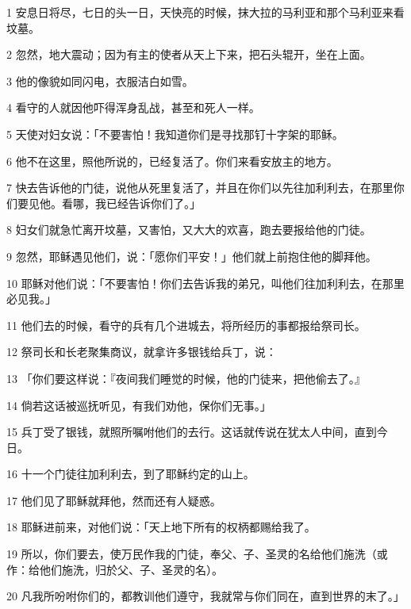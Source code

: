 \par 1 安息日将尽，七日的头一日，天快亮的时候，抹大拉的马利亚和那个马利亚来看坟墓。
\par 2 忽然，地大震动；因为有主的使者从天上下来，把石头辊开，坐在上面。
\par 3 他的像貌如同闪电，衣服洁白如雪。
\par 4 看守的人就因他吓得浑身乱战，甚至和死人一样。
\par 5 天使对妇女说：「不要害怕！我知道你们是寻找那钉十字架的耶稣。
\par 6 他不在这里，照他所说的，已经复活了。你们来看安放主的地方。
\par 7 快去告诉他的门徒，说他从死里复活了，并且在你们以先往加利利去，在那里你们要见他。看哪，我已经告诉你们了。」
\par 8 妇女们就急忙离开坟墓，又害怕，又大大的欢喜，跑去要报给他的门徒。
\par 9 忽然，耶稣遇见他们，说：「愿你们平安！」他们就上前抱住他的脚拜他。
\par 10 耶稣对他们说：「不要害怕！你们去告诉我的弟兄，叫他们往加利利去，在那里必见我。」
\par 11 他们去的时候，看守的兵有几个进城去，将所经历的事都报给祭司长。
\par 12 祭司长和长老聚集商议，就拿许多银钱给兵丁，说：
\par 13 「你们要这样说：『夜间我们睡觉的时候，他的门徒来，把他偷去了。』
\par 14 倘若这话被巡抚听见，有我们劝他，保你们无事。」
\par 15 兵丁受了银钱，就照所嘱咐他们的去行。这话就传说在犹太人中间，直到今日。
\par 16 十一个门徒往加利利去，到了耶稣约定的山上。
\par 17 他们见了耶稣就拜他，然而还有人疑惑。
\par 18 耶稣进前来，对他们说：「天上地下所有的权柄都赐给我了。
\par 19 所以，你们要去，使万民作我的门徒，奉父、子、圣灵的名给他们施洗（或作：给他们施洗，归於父、子、圣灵的名）。
\par 20 凡我所吩咐你们的，都教训他们遵守，我就常与你们同在，直到世界的末了。」



